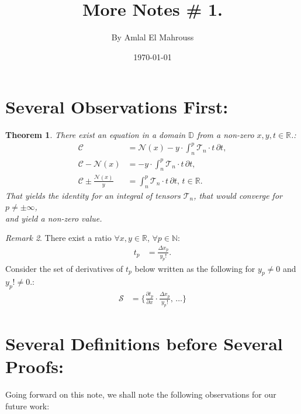 \documentclass[10pt]{article}
\title{%
	\vspace{-1.5em}%
	\large\textbf{More Notes \# 1.}%
}
\author{By Amlal El Mahrouss}
\date{\today}
\theoremstyle{plain}
\newtheorem{theorem}{Theorem}[section]
\theoremstyle{definition}
\theoremstyle{remark}
\newtheorem{remark}[theorem]{Remark}
\begin{document}
	
	\maketitle
	\tableofcontents
	\newpage

\section{Several Observations First:}

\begin{theorem}
There exist an equation in a domain $\mathbb{D}$ from a non-zero $x, y, t \in \mathbb{R}$.:
\begin{align*}
    \mathcal{C} &= \mathcal{N}(x) - y \cdot \int_{n}^{p} \mathcal{T}_{n} \cdot t \, \partial t,\\
    \mathcal{C} - \mathcal{N}(x) &= -y \cdot \int_{n}^{p} \mathcal{T}_{n} \cdot t \, \partial t,\\
    \mathcal{C} \pm \frac{\mathcal{N}(x)}{y} &= \int_{n}^{p} \mathcal{T}_{n} \cdot t \, \partial t, \, t \in \mathbb{R}.
\end{align*}
That yields the identity for an integral of tensors $\mathcal{T}_n$, that would converge for $p \neq \pm \infty$,\\ and yield a non-zero value.
\end{theorem}

\begin{remark}
There exist a ratio $\forall x, y \in \mathbb{R}$, $\forall p \in \mathbb{N}$:
\begin{align*}
	t_p &= \frac{\Delta x_p}{y_p!}.
\end{align*}
Consider the set of derivatives of $t_p$ below written as the following for $y_p \neq 0$ and $y_p! \neq 0$.:
\begin{align*}
	\mathcal{S} &= \{ \frac{\partial t_p}{\partial x} \cdot \frac{\Delta x_p}{y_p!}, \, \dots \}
\end{align*}
\end{remark}

\section{Several Definitions before Several Proofs:}

Going forward on this note, we shall note the following observations for our future work:
\end{document}
